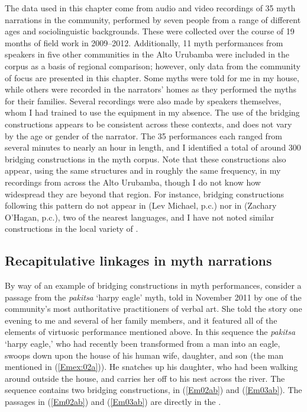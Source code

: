 \documentclass[output=paper]{LSP/langsci}
\begin{document}
The data used in this chapter come from audio and video recordings of 35 myth narrations in the community, performed by seven people from a range of different ages and sociolinguistic backgrounds. These were collected over the course of 19 months of field work in 2009--2012. Additionally, 11 myth performances from speakers in five other communities in the {Alto Urubamba} were included in the corpus as a basis of regional comparison; however, only data from the community of focus are presented in this chapter. Some myths were told for me in my house, while others were recorded in the narrators’ homes as they performed the myths for their families. Several recordings were also made by  speakers themselves, whom I had trained to use the equipment in my absence. The use of the bridging constructions appears to be consistent across these contexts, and does not vary by the age or gender of the narrator. The 35 performances each ranged from several minutes to nearly an hour in length, and I identified a total of around 300 bridging constructions in the myth corpus. Note that these constructions also appear, using the same structures and in roughly the same frequency, in my recordings from across the {Alto Urubamba}, though I do not know how widespread they are beyond that region. For instance, bridging constructions following this pattern do not appear in  (Lev Michael, p.c.) nor in  (Zachary O’Hagan, p.c.), two of the nearest  languages, and I have not noted similar constructions in the local variety of . 

\subsection{Recapitulative linkages in myth narrations}
\label{Emrecap.myth}
By way of an example of bridging constructions in  myth performances, consider a passage from the \textit{pakitsa} `harpy eagle' myth, told in November 2011 by one of the community’s most authoritative practitioners of  verbal art. She told the story one evening to me and several of her family members, and it featured all of the elements of virtuosic performance mentioned above. In this sequence the \textit{pakitsa} `harpy eagle,' who had recently been transformed from a man into an eagle, swoops down upon the house of his human wife, daughter, and son (the man mentioned in (\ref{Emex:02a})). He snatches up his daughter, who had been walking around outside the house, and carries her off to his nest across the river. The sequence contains two bridging constructions, in (\ref{Em02ab}) and (\ref{Em03ab}). The passages in (\ref{Em02ab}) and (\ref{Em03ab}) are directly  in the . 
\end{document}
